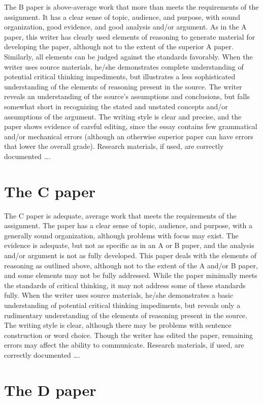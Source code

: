 The B paper is above-average work that more than meets the requirements of the 
assignment. It has a clear sense of topic, audience, and purpose, with sound 
organization, good evidence, and good analysis and/or argument. As in the A paper, this 
writer has clearly used elements of reasoning to generate material for developing the 
paper, although not to the extent of the superior A paper. Similarly, all elements can be 
judged against the standards favorably. When the writer uses source materials, he/she 
demonstrates complete understanding of potential critical thinking impediments, but 
illustrates a less sophisticated understanding of the elements of reasoning present in 
the source. The writer reveals an understanding of the source’s assumptions and 
conclusions, but falls somewhat short in recognizing the stated and unstated concepts 
and/or assumptions of the argument. The writing style is clear and precise, and the 
paper shows evidence of careful editing, since the essay contains few grammatical 
and/or mechanical errors (although an otherwise superior paper can have errors that 
lower the overall grade). Research materials, if used, are correctly documented \dots.
\section{The C paper}
The C paper is adequate, average work that meets the requirements of the assignment. 
The paper has a clear sense of topic, audience, and purpose, with a generally sound 
organization, although problems with focus may exist. The evidence is adequate, but 
not as specific as in an A or B paper, and the analysis and/or argument is not as fully 
developed. This paper deals with the elements of reasoning as outlined above, although 
not to the extent of the A and/or B paper, and some elements may not be fully 
addressed. While the paper minimally meets the standards of critical thinking, it may 
not address some of these standards fully. When the writer uses source materials, 
he/she demonstrates a basic understanding of potential critical thinking impediments, 
but reveals only a rudimentary understanding of the elements of reasoning present in 
the source. The writing style is clear, although there may be problems with sentence 
construction or word choice. Though the writer has edited the paper, remaining errors 
may affect the ability to communicate. Research materials, if used, are correctly 
documented \dots.

\section{The D paper}

